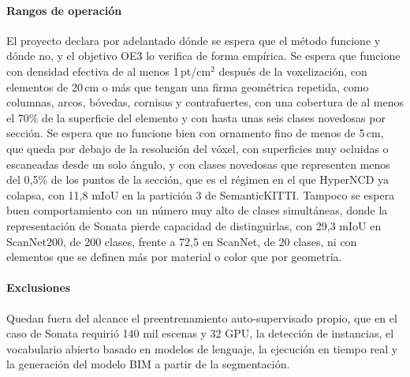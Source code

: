 \paragraph*{Rangos de operación}
El proyecto declara por adelantado dónde se espera que el método funcione y dónde
no, y el objetivo OE3 lo verifica de forma empírica. Se espera que funcione con
densidad efectiva de al menos 1\,pt/cm$^2$ después de la voxelización, con
elementos de 20\,cm o más que tengan una firma geométrica repetida, como
columnas, arcos, bóvedas, cornisas y contrafuertes, con una cobertura de al menos
el 70\% de la superficie del elemento y con hasta unas seis clases novedosas por
sección. Se espera que no funcione bien con ornamento fino de menos de 5\,cm, que
queda por debajo de la resolución del vóxel, con superficies muy ocluidas o
escaneadas desde un solo ángulo, y con clases novedosas que representen menos del
0,5\% de los puntos de la sección, que es el régimen en el que HyperNCD ya
colapsa, con 11,8 mIoU en la partición 3 de SemanticKITTI. Tampoco se espera buen
comportamiento con un número muy alto de clases simultáneas, donde la
representación de Sonata pierde capacidad de distinguirlas, con 29,3 mIoU en
ScanNet200, de 200 clases, frente a 72,5 en ScanNet, de 20 clases, ni con
elementos que se definen más por material o color que por geometría.

\paragraph*{Exclusiones}
Quedan fuera del alcance el preentrenamiento auto-supervisado propio, que en el
caso de Sonata requirió 140 mil escenas y 32 GPU, la detección de instancias, el
vocabulario abierto basado en modelos de lenguaje, la ejecución en tiempo real y
la generación del modelo BIM a partir de la segmentación.

\renewcommand{\thetable}{\arabic{chapter}.\arabic{table}}
\setcounter{table}{0}
